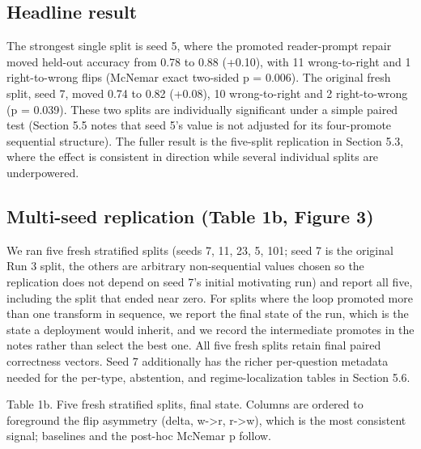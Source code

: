 \subsection{Headline result}

The strongest single split is seed 5, where the promoted reader-prompt repair moved held-out accuracy from 0.78 to 0.88 (+0.10), with 11 wrong-to-right and 1 right-to-wrong flips (McNemar exact two-sided p = 0.006). The original fresh split, seed 7, moved 0.74 to 0.82 (+0.08), 10 wrong-to-right and 2 right-to-wrong (p = 0.039). These two splits are individually significant under a simple paired test (Section 5.5 notes that seed 5's value is not adjusted for its four-promote sequential structure). The fuller result is the five-split replication in Section 5.3, where the effect is consistent in direction while several individual splits are underpowered.

\subsection{Multi-seed replication (Table 1b, Figure 3)}

We ran five fresh stratified splits (seeds 7, 11, 23, 5, 101; seed 7 is the original Run 3 split, the others are arbitrary non-sequential values chosen so the replication does not depend on seed 7's initial motivating run) and report all five, including the split that ended near zero. For splits where the loop promoted more than one transform in sequence, we report the final state of the run, which is the state a deployment would inherit, and we record the intermediate promotes in the notes rather than select the best one. All five fresh splits retain final paired correctness vectors. Seed 7 additionally has the richer per-question metadata needed for the per-type, abstention, and regime-localization tables in Section 5.6.

Table 1b. Five fresh stratified splits, final state. Columns are ordered to foreground the flip asymmetry (delta, w->r, r->w), which is the most consistent signal; baselines and the post-hoc McNemar p follow.

\begin{center}\small
{}
\end{center}


